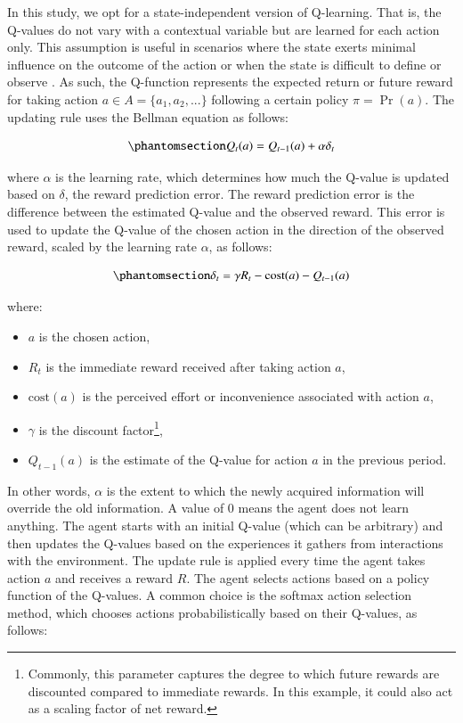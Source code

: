 \documentclass[
  number,
  preprint,
  3p,
  onecolumn]{elsarticle}
\begin{document}
In this study, we opt for a state-independent version of Q-learning.
That is, the Q-values do not vary with a contextual variable but are
learned for each action only. This assumption is useful in scenarios
where the state exerts minimal influence on the outcome of the action or
when the state is difficult to define or observe \citep{sutton2018}. As
such, the Q-function represents the expected return or future reward for
taking action \(a \in A = \{a_1,a_2,...\}\) following a certain policy
\(\pi = \Pr(a)\). The updating rule uses the Bellman equation as
follows:

\begin{equation}\phantomsection\label{eq-q-learn}{
Q_{t}(a) = Q_{t-1}(a) + \alpha \delta_t
}\end{equation}

where \(\alpha\) is the learning rate, which determines how much the
Q-value is updated based on \(\delta\), the reward prediction error. The
reward prediction error is the difference between the estimated Q-value
and the observed reward. This error is used to update the Q-value of the
chosen action in the direction of the observed reward, scaled by the
learning rate \(\alpha\), as follows:

\begin{equation}\phantomsection\label{eq-RPE}{
\delta_t = \gamma R_t - \text{cost}(a) - Q_{t-1}(a)
}\end{equation}

where:

\begin{itemize}
\item
  \(a\) is the chosen action,
\item
  \(R_t\) is the immediate reward received after taking action \(a\),
\item
  \(\text{cost}(a)\) is the perceived effort or inconvenience associated
  with action \(a\),
\item
  \(\gamma\) is the discount factor\footnote{Commonly, this parameter
    captures the degree to which future rewards are discounted compared
    to immediate rewards. In this example, it could also act as a
    scaling factor of net reward.},
\item
  \(Q_{t-1}(a)\) is the estimate of the Q-value for action \(a\) in the
  previous period.
\end{itemize}

In other words, \(\alpha\) is the extent to which the newly acquired
information will override the old information. A value of 0 means the
agent does not learn anything. The agent starts with an initial Q-value
(which can be arbitrary) and then updates the Q-values based on the
experiences it gathers from interactions with the environment. The
update rule is applied every time the agent takes action \(a\) and
receives a reward \(R\). The agent selects actions based on a policy
function of the Q-values. A common choice is the softmax action
selection method, which chooses actions probabilistically based on their
Q-values, as follows:
\end{document}
